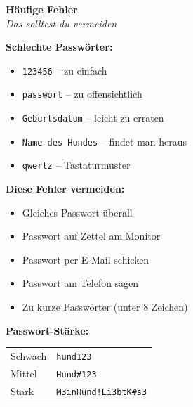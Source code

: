 \documentclass[a4paper,landscape,8pt]{extarticle}
\begin{document}
\hfill%
\begin{minipage}[t]{0.32\linewidth}
\begin{center}
\colorbox{weakorange!10}{%
\begin{minipage}{0.95\linewidth}
\vspace{2mm}
\begin{center}
{\Large\bfseries\textcolor{weakorange}{Häufige Fehler}}\\[1pt]
{\footnotesize\itshape Das solltest du vermeiden}
\end{center}
\vspace{2mm}
\end{minipage}%
}
\end{center}

\vspace{1mm}

\textbf{Schlechte Passwörter:}
\begin{itemize}
\item \texttt{123456} -- zu einfach
\item \texttt{passwort} -- zu offensichtlich
\item \texttt{Geburtsdatum} -- leicht zu erraten
\item \texttt{Name des Hundes} -- findet man heraus
\item \texttt{qwertz} -- Tastaturmuster
\end{itemize}

\textbf{Diese Fehler vermeiden:}
\begin{itemize}
\item[$\times$] Gleiches Passwort überall
\item[$\times$] Passwort auf Zettel am Monitor
\item[$\times$] Passwort per E-Mail schicken
\item[$\times$] Passwort am Telefon sagen
\item[$\times$] Zu kurze Passwörter (unter 8 Zeichen)
\end{itemize}

\vspace{2mm}

\textbf{Passwort-Stärke:}

\renewcommand{\arraystretch}{1.3}
\begin{tabular}{@{}p{2cm}p{4cm}@{}}
\textcolor{warnred}{Schwach} & \texttt{hund123} \\
\textcolor{weakorange}{Mittel} & \texttt{Hund\#123} \\
\textcolor{lockgreen}{Stark} & \texttt{M3inHund!Li3btK\#s3} \\
\end{tabular}
\renewcommand{\arraystretch}{1}

\end{minipage}
\end{document}
